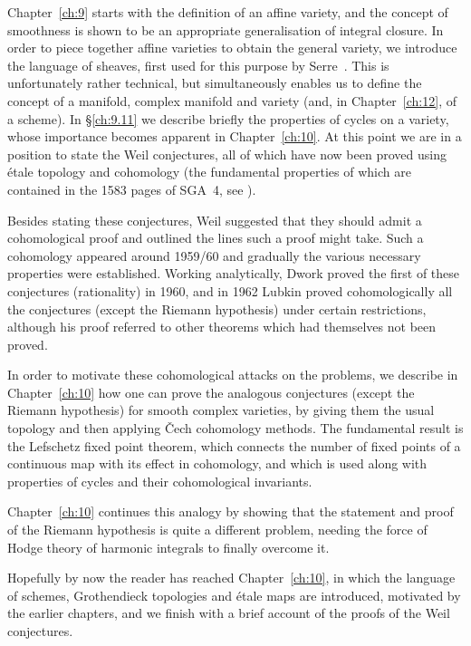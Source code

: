 \documentclass[10pt]{article}
\theoremstyle{definition}
\begin{document}
Chapter~\ref{ch:9} starts with the definition of an affine variety, and the concept of smoothness is shown to be an appropriate generalisation of integral closure.
In order to piece together affine varieties to obtain the general variety, we introduce the language of sheaves, first used for this purpose by Serre~\cite{bib:166}.
This is unfortunately rather technical, but simultaneously enables us to define the concept of a manifold, complex manifold and variety (and, in Chapter~\ref{ch:12}, of a scheme).
In \S\ref{ch:9.11} we describe briefly the properties of cycles on a variety, whose importance becomes apparent in Chapter~\ref{ch:10}.
At this point we are in a position to state the Weil conjectures, all of which have now been proved using \'etale topology and cohomology (the fundamental properties of which are contained in the 1583 pages of SGA~4, see \cite{bib:14}).

Besides stating these conjectures, Weil suggested that they should admit a cohomological proof and outlined the lines such a proof might take.
Such a cohomology appeared around 1959/60 and gradually the various necessary properties were established.
Working analytically, Dwork proved the first of these conjectures (rationality) in 1960, and in 1962 Lubkin proved cohomologically all the conjectures (except the Riemann hypothesis) under certain restrictions, although his proof referred to other theorems which had themselves not been proved.

In order to motivate these cohomological attacks on the problems, we describe in Chapter~\ref{ch:10} how one can prove the analogous conjectures (except the Riemann hypothesis) for smooth complex varieties, by giving them the usual topology and then applying \v{C}ech cohomology methods.
The fundamental result is the Lefschetz fixed point theorem, which connects the number of fixed points of a continuous map with its effect in cohomology, and which is used along with properties of cycles and their cohomological invariants.

Chapter~\ref{ch:10} continues this analogy by showing that the statement and proof of the Riemann hypothesis is quite a different problem, needing the force of Hodge theory of harmonic integrals to finally overcome it.

Hopefully by now the reader has reached Chapter~\ref{ch:10}, in which the language of schemes, Grothendieck topologies and \'etale maps are introduced, motivated by the earlier chapters, and we finish with a brief account of the proofs of the Weil conjectures.
\end{document}
